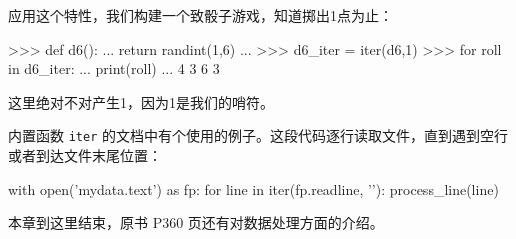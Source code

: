 应用这个特性，我们构建一个致骰子游戏，知道掷出1点为止：
\begin{python}
>>> def d6():
...     return randint(1,6)
... 
>>> d6_iter = iter(d6,1)
>>> for roll in d6_iter:
...     print(roll)
... 
4 3 6 3
\end{python}

这里绝对不对产生1，因为1是我们的哨符。

内置函数 \texttt{iter} 的文档中有个使用的例子。这段代码逐行读取文件，直到遇到空行或者到达文件末尾位置：
\begin{python}
with open('mydata.text') as fp:
    for line in iter(fp.readline, '\n'):
        process_line(line)
\end{python}

本章到这里结束，原书 P360 页还有对数据处理方面的介绍。

\newpage